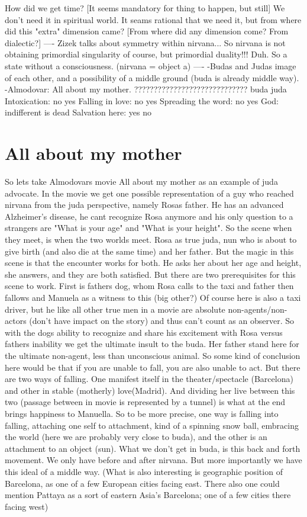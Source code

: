 \documentclass{book}
\begin{document}
How did we get time? [It seems mandatory for thing to happen, but still] We don't need it in spiritual world. It seams rational that we need it, but from where did this "extra" dimension came? [From where did any dimension come? From dialectic?] 
----
Zizek talks about symmetry within nirvana... So nirvana is not obtaining primordial singularity of course, but primordial duality!!! Duh. So a state without a consciousness. (nirvana = object a)
----
-Budas and Judas image of each other, and a possibility of a middle ground (buda is already middle way).
-Almodovar: All about my mother.
?????????????????????????????
					buda		juda
Intoxication:		no			yes
Falling in love:	no			yes
Spreading the word: no			yes
God:				indifferent	is dead
Salvation here:		yes			no

\section{All about my mother}
So lets take Almodovars movie All about my mother as an example of juda advocate. In the movie we get one possible representation of a guy who reached nirvana from the juda perspective, namely Rosas father. He has an advanced Alzheimer's disease, he cant recognize Rosa anymore and his only question to a strangers are "What is your age" and "What is your height". So the scene when they meet, is when the two worlds meet. Rosa as true juda, nun who is about to give birth (and also die at the same time) and her father. But the magic in this scene is that the encounter works for both. He asks her about her age and height, she answers, and they are both satisfied. But there are two prerequisites for this scene to work. First is fathers dog, whom Rosa calls to the taxi and father then fallows and Manuela as a witness to this (big other?) Of course here is also a taxi driver, but he like all other true men in a movie are absolute non-agents/non-actors (don't have impact on the story) and thus can't count as an observer. So with the dogs ability to recognize and share his excitement with Rosa versus fathers inability we get the ultimate insult to the buda. Her father stand here for the ultimate non-agent, less than unconscious animal. 
So some kind of conclusion here would be that if you are unable to fall, you are also unable to act. But there are two ways of falling. One manifest itself in the theater/spectacle (Barcelona) and other in stable (motherly) love(Madrid). And dividing her live between this two (passage between in movie is represented by a tunnel) is what at the end brings happiness to Manuella. So to be more precise, one way is falling into falling, attaching one self to attachment, kind of a spinning snow ball, embracing the world (here we are probably very close to buda), and the other is an attachment to an object (sun). What we don't get in buda, is this back and forth movement. We only have before and after nirvana. But more importantly we have this ideal of a middle way. (What is also interesting is geographic position of Barcelona, as one of a few European cities facing east. There also one could mention Pattaya as a sort of eastern Asia's Barcelona; one of a few cities there facing west)
\end{document}

